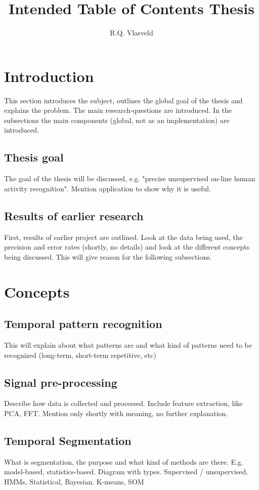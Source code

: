\documentclass[a4paper,10pt]{extarticle}
\author{R.Q. Vlasveld}
\title{Intended Table of Contents Thesis}
\begin{document}
\maketitle
\tableofcontents

\section{Introduction}
This section introduces the subject, outlines the global goal of the thesis
and explains the problem. The main research-questions are introduced. In the
subsections the main components (global, not as an implementation) are
introduced.

  \subsection{Thesis goal}
  The goal of the thesis will be discussed, e.g. "precise unsupervised on-line human activity recognition". Mention application to show why it is useful.

  \subsection{Results of earlier research}
  First, results of earlier project are outlined. Look at the data being used, the precision and error rates (shortly, no details) and look at the different concepts being discussed. This will give reason for the following subsections.

\section{Concepts}

  \subsection{Temporal pattern recognition}
  This will explain about what patterns are and what kind of patterns need to be recognized (long-term, short-term repetitive, etc)

	\subsection{Signal pre-processing}
  Describe how data is collected and processed. Include feature extraction, like PCA, FFT. Mention only shortly with meaning, no further explanation.

	\subsection{Temporal Segmentation}
  What is segmentation, the purpose and what kind of methods are there. E.g. model-based, statistics-based. Diagram with types. Supervised / unsupervised. HMMs, Statistical, Bayesian. K-means, SOM
\end{document}
